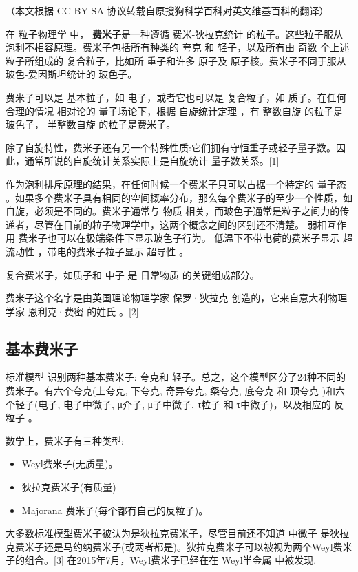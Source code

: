 
（本文根据 CC-BY-SA 协议转载自原搜狗科学百科对英文维基百科的翻译）

在 粒子物理学 中， \textbf{费米子}是一种遵循 费米-狄拉克统计 的粒子。这些粒子服从 泡利不相容原理。费米子包括所有种类的 夸克 和 轻子，以及所有由 奇数 个上述粒子所组成的 复合粒子，比如所 重子和许多 原子及 原子核。费米子不同于服从 玻色-爱因斯坦统计的 玻色子。

费米子可以是 基本粒子，如 电子，或者它也可以是 复合粒子，如 质子。在任何合理的情况 相对论的 量子场论下，根据 自旋统计定理 ，有 整数自旋 的粒子是 玻色子， 半整数自旋 的粒子是费米子。

除了自旋特性，费米子还有另一个特殊性质:它们拥有守恒重子或轻子量子数。因此，通常所说的自旋统计关系实际上是自旋统计-量子数关系。[1]

作为泡利排斥原理的结果，在任何时候一个费米子只可以占据一个特定的 量子态 。如果多个费米子具有相同的空间概率分布，那么每个费米子的至少一个性质，如自旋，必须是不同的。费米子通常与 物质 相关，而玻色子通常是粒子之间力的传递者，尽管在目前的粒子物理学中，这两个概念之间的区别还不清楚。 弱相互作用 费米子也可以在极端条件下显示玻色子行为。 低温下不带电荷的费米子显示 超流动性 ，带电的费米子粒子显示 超导性 。

复合费米子，如质子和 中子 是 日常物质 的关键组成部分。

费米子这个名字是由英国理论物理学家 保罗·狄拉克 创造的，它来自意大利物理学家 恩利克·费密 的姓氏 。[2]

\subsection{基本费米子}
标准模型 识别两种基本费米子: 夸克和 轻子。总之，这个模型区分了24种不同的费米子。有六个夸克(上夸克, 下夸克, 奇异夸克, 粲夸克, 底夸克 和 顶夸克 )和六个轻子(电子, 电子中微子, μ介子, μ子中微子, τ粒子 和 τ中微子)，以及相应的 反粒子 。

数学上，费米子有三种类型:
\begin{itemize}
\item Weyl费米子(无质量)。
\item 狄拉克费米子(有质量)
\item Majorana 费米子(每个都有自己的反粒子)。
\end{itemize}
大多数标准模型费米子被认为是狄拉克费米子，尽管目前还不知道 中微子 是狄拉克费米子还是马约纳费米子(或两者都是)。狄拉克费米子可以被视为两个Weyl费米子的组合。[3] 在2015年7月，Weyl费米子已经在在 Weyl半金属 中被发现.

